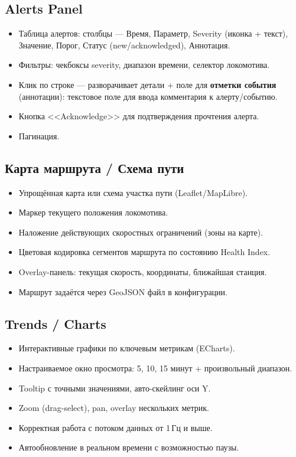 \documentclass[12pt,a4paper]{article}
\begin{document}
\subsection{Alerts Panel}
\label{sec:alerts}

\begin{itemize}[nosep]
  \item Таблица алертов: столбцы --- Время, Параметр, Severity (иконка + текст), Значение, Порог, Статус (new/acknowledged), Аннотация.
  \item Фильтры: чекбоксы severity, диапазон времени, селектор локомотива.
  \item Клик по строке --- разворачивает детали + поле для \textbf{отметки события} (аннотации): текстовое поле для ввода комментария к алерту/событию.
  \item Кнопка <<Acknowledge>> для подтверждения прочтения алерта.
  \item Пагинация.
\end{itemize}

\subsection{Карта маршрута / Схема пути}

\begin{itemize}[nosep]
  \item Упрощённая карта или схема участка пути (Leaflet/MapLibre).
  \item Маркер текущего положения локомотива.
  \item Наложение действующих скоростных ограничений (зоны на карте).
  \item Цветовая кодировка сегментов маршрута по состоянию Health Index.
  \item Overlay-панель: текущая скорость, координаты, ближайшая станция.
  \item Маршрут задаётся через GeoJSON файл в конфигурации.
\end{itemize}

\subsection{Trends / Charts}

\begin{itemize}[nosep]
  \item Интерактивные графики по ключевым метрикам (ECharts).
  \item Настраиваемое окно просмотра: 5, 10, 15 минут + произвольный диапазон.
  \item Tooltip с точными значениями, авто-скейлинг оси Y.
  \item Zoom (drag-select), pan, overlay нескольких метрик.
  \item Корректная работа с потоком данных от 1\,Гц и выше.
  \item Автообновление в реальном времени с возможностью паузы.
\end{itemize}
\end{document}
